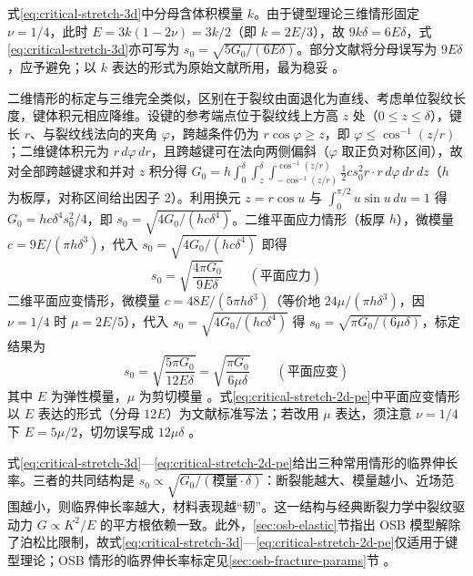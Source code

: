 \begin{remark}
  式\eqref{eq:critical-stretch-3d}中分母含体积模量 $k$。由于键型理论三维情形固定 $\nu=1/4$，此时 $E=3k(1-2\nu)=3k/2$（即 $k=2E/3$），故 $9k\delta=6E\delta$，式\eqref{eq:critical-stretch-3d}亦可写为 $s_{0}=\sqrt{5G_{0}/(6E\delta)}$。部分文献将分母误写为 $9E\delta$，应予避免；以 $k$ 表达的形式为原始文献所用，最为稳妥 \cite{SillingAskari2005,OterkusOterkus2026}。
\end{remark}

二维情形的标定与三维完全类似，区别在于裂纹由面退化为直线、考虑单位裂纹长度，键体积元相应降维。设键的参考端点位于裂纹线上方高 $z$ 处（$0\le z\le\delta$），键长 $r$、与裂纹线法向的夹角 $\varphi$，跨越条件仍为 $r\cos\varphi\ge z$，即 $\varphi\le\cos^{-1}(z/r)$；二维键体积元为 $r\,d\varphi\,dr$，且跨越键可在法向两侧偏斜（$\varphi$ 取正负对称区间），故对全部跨越键求和并对 $z$ 积分得 $G_{0}=h\int_{0}^{\delta}\int_{z}^{\delta}\int_{-\cos^{-1}(z/r)}^{\cos^{-1}(z/r)}\tfrac{1}{2}cs_{0}^{2}r\cdot r\,d\varphi\,dr\,dz$（$h$ 为板厚，对称区间给出因子 $2$）。利用换元 $z=r\cos u$ 与 $\int_{0}^{\pi/2}u\sin u\,du=1$ 得 $G_{0}=hc\delta^{4}s_{0}^{2}/4$，即 $s_{0}=\sqrt{4G_{0}/(hc\delta^{4})}$。二维平面应力情形（板厚 $h$），微模量 $c=9E/(\pi h\delta^{3})$，代入 $s_{0}=\sqrt{4G_{0}/(hc\delta^{4})}$ 即得
\begin{equation}
  s_{0}=\sqrt{\frac{4\pi G_{0}}{9E\delta}}
  \qquad(\text{平面应力})
  \label{eq:critical-stretch-2d-ps}
\end{equation}
二维平面应变情形，微模量 $c=48E/(5\pi h\delta^{3})$（等价地 $24\mu/(\pi h\delta^{3})$，因 $\nu=1/4$ 时 $\mu=2E/5$），代入 $s_{0}=\sqrt{4G_{0}/(hc\delta^{4})}$ 得 $s_{0}=\sqrt{\pi G_{0}/(6\mu\delta)}$，标定结果为
\begin{equation}
  s_{0}=\sqrt{\frac{5\pi G_{0}}{12E\delta}}=\sqrt{\frac{\pi G_{0}}{6\mu\delta}}
  \qquad(\text{平面应变})
  \label{eq:critical-stretch-2d-pe}
\end{equation}
其中 $E$ 为弹性模量，$\mu$ 为剪切模量 \cite{HaBobaru2010,MadenciOterkus2014}。式\eqref{eq:critical-stretch-2d-pe}中平面应变情形以 $E$ 表达的形式（分母 $12E$）为文献标准写法；若改用 $\mu$ 表达，须注意 $\nu=1/4$ 下 $E=5\mu/2$，切勿误写成 $12\mu\delta$ \cite{OterkusOterkus2026}。

\begin{remark}
  式\eqref{eq:critical-stretch-3d}—\eqref{eq:critical-stretch-2d-pe}给出三种常用情形的临界伸长率。三者的共同结构是 $s_{0}\propto\sqrt{G_{0}/(\text{模量}\cdot\delta)}$：断裂能越大、模量越小、近场范围越小，则临界伸长率越大，材料表现越“韧”。这一结构与经典断裂力学中裂纹驱动力 $G\propto K^{2}/E$ 的平方根依赖一致。此外，\ref{sec:osb-elastic}节指出 OSB 模型解除了泊松比限制，故式\eqref{eq:critical-stretch-3d}—\eqref{eq:critical-stretch-2d-pe}仅适用于键型理论；OSB 情形的临界伸长率标定见\ref{sec:osb-fracture-params}节 \cite{HaBobaru2010}。
\end{remark}

